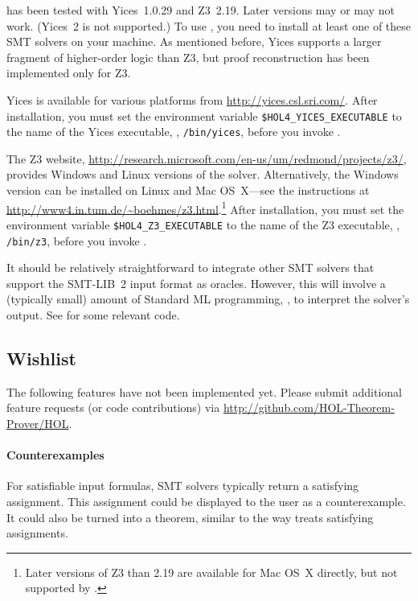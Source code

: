  has been tested with Yices~1.0.29 and Z3~2.19. Later
versions may or may not work.  (Yices~2 is not supported.)  To use
, you need to install at least one of these SMT solvers
on your machine.  As mentioned before, Yices supports a larger
fragment of higher-order logic than Z3, but proof reconstruction has
been implemented only for Z3.

Yices is available for various platforms from
\url{http://yices.csl.sri.com/}.  After installation, you must set the
environment variable {\tt \$HOL4\_YICES\_EXECUTABLE} to the name of
the Yices executable, \eg, {\tt /bin/yices}, before you invoke \HOL.

The Z3 website,
\url{http://research.microsoft.com/en-us/um/redmond/projects/z3/},
provides Windows and Linux versions of the solver.  Alternatively, the
Windows version can be installed on Linux and Mac OS~X---see the
instructions at
\url{http://www4.in.tum.de/~boehmes/z3.html}.\footnote{Later versions
  of Z3 than 2.19 are available for Mac OS~X directly, but not
  supported by \HOL.}  After installation, you must set the
environment variable {\tt \$HOL4\_Z3\_EXECUTABLE} to the name of the
Z3 executable, \eg, {\tt /bin/z3}, before you invoke \HOL.

It should be relatively straightforward to integrate other SMT solvers
that support the SMT-LIB~2 input format as oracles.  However, this
will involve a (typically small) amount of Standard ML programming,
\eg, to interpret the solver's output.  See  for some
relevant code.

\subsection{Wishlist}

The following features have not been implemented yet.  Please submit
additional feature requests (or code contributions) via
\url{http://github.com/HOL-Theorem-Prover/HOL}.

\paragraph{Counterexamples}

For satisfiable input formulas, SMT solvers typically return a
satisfying assignment.  This assignment could be displayed to the
\HOL{} user as a counterexample.  It could also be turned into a
theorem, similar to the way  treats satisfying
assignments.


